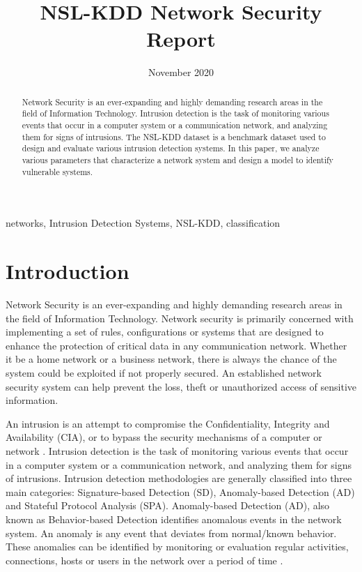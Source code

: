 \documentclass[conference]{IEEEtran}
\title{NSL-KDD Network Security Report}
\author{\IEEEauthorblockN{Rojina Deuja}
\IEEEauthorblockA{\textit{Department of Computer Science and Engineering} \\
\textit{University of Nebraska-Lincoln}\\
Lincoln, United States \\
rojinadeuja33g@gmail.com}}
\date{November 2020}
\begin{document}
\maketitle

\begin{abstract}
Network Security is an ever-expanding and highly demanding research areas in the field of Information Technology. Intrusion detection is the task of monitoring various events that occur in a computer system or a communication network, and analyzing them for signs of intrusions. The NSL-KDD dataset is a benchmark dataset used to design and evaluate various intrusion detection systems. In this paper, we analyze various parameters that characterize a network system and design a model to identify vulnerable systems.
\end{abstract}

\begin{IEEEkeywords}
networks, Intrusion Detection Systems, NSL-KDD, classification
\end{IEEEkeywords}

\section{Introduction}
Network Security is an ever-expanding and highly demanding research areas in the field of Information Technology. Network security is primarily concerned with implementing a set of rules, configurations or systems that are designed to enhance the protection of critical data in any communication network. Whether it be a home network or a business network, there is always the chance of the system could be exploited if not properly secured. An established network security system can help prevent the loss, theft or unauthorized access of sensitive information.

An intrusion is an attempt to compromise the Confidentiality, Integrity and Availability (CIA), or to bypass the security mechanisms of a computer or network \cite{b1}. Intrusion detection is the task of monitoring various events that occur in a computer system or a communication network, and analyzing them for signs of intrusions. Intrusion detection methodologies are generally classified into three main categories: Signature-based Detection (SD), Anomaly-based Detection (AD) and Stateful Protocol Analysis (SPA). Anomaly-based Detection (AD), also known as Behavior-based Detection identifies anomalous events in the network system. An anomaly is any event that deviates from normal/known behavior. These anomalies can be identified by monitoring or evaluation regular activities, connections, hosts or users in the network over a period of time \cite{b2}.
\end{document}
